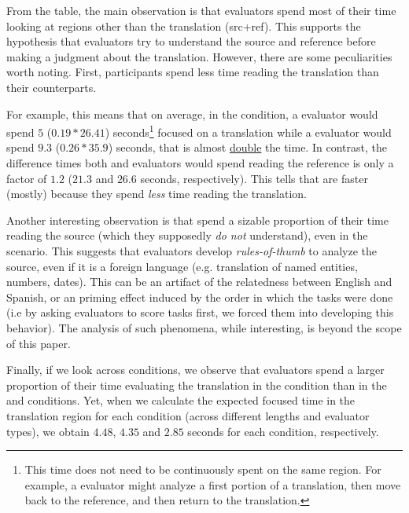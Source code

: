 From the table, the main observation is that evaluators spend most of their time looking at regions other than the translation (src+ref). This supports the hypothesis that evaluators try to understand the source and reference before making a judgment about the translation. However, there are some peculiarities worth noting. First, \bil participants spend less time reading the translation than their \mono counterparts. %
\\
\pagebreak
\vspace{10pt}

For example, this means that on average, in the \tgt condition, a \bil evaluator would spend  $5$ ($0.19*26.41$) seconds\footnote{This time does not need to be continuously spent on the same region. For example, a evaluator might analyze a first portion of a translation, then move back to the reference, and then return to the translation.} focused on a \llong translation while a \mono evaluator would spend $9.3$ ($0.26*35.9$) seconds, that is almost \underline{double} the time. In contrast, the difference times both \bil and \mono evaluators would spend reading the reference is only a factor of $1.2$ ($21.3$ and $26.6$ seconds, respectively). This tells that \bil are faster (mostly) because they spend \emph{less} time reading the translation.

Another interesting observation is that \mono spend a sizable proportion of their time reading the source (which they supposedly \emph{do not} understand), even in the \srctgt scenario. This suggests that \mono evaluators develop \emph{rules-of-thumb} to analyze the source, even if it is a foreign language (e.g. translation of named entities, numbers, dates). This can be an artifact of the relatedness between English and Spanish, or an priming effect induced by the order in which the tasks were done (i.e by asking \mono evaluators to score \src tasks first, we forced them into developing this behavior). The analysis of such phenomena, while interesting, is beyond the scope of this paper.

Finally, if we look across conditions, we observe that evaluators spend a larger proportion of their time evaluating the translation in the \tgt condition than in the \src and \srctgt conditions. Yet, when we calculate the expected focused time in the translation region for each condition (across different lengths and evaluator types), we obtain $4.48$, $4.35$ and $2.85$ seconds for each condition, respectively. \\


